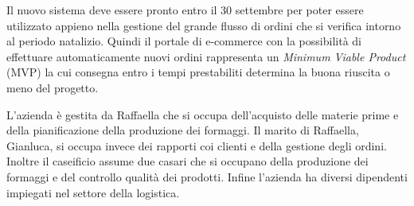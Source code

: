 Il nuovo sistema deve essere pronto entro il 30 settembre per poter essere utilizzato appieno nella gestione del grande flusso di ordini che si verifica intorno al periodo natalizio. Quindi il portale di e-commerce con la possibilità di effettuare automaticamente nuovi ordini rappresenta un \emph{Minimum Viable Product} (MVP) la cui consegna entro i tempi prestabiliti determina la buona riuscita o meno del progetto.

L'azienda è gestita da Raffaella che si occupa dell'acquisto delle materie prime e della pianificazione della produzione dei formaggi. Il marito di Raffaella, Gianluca, si occupa invece dei rapporti coi clienti e della gestione degli ordini. Inoltre il caseificio assume due casari che si occupano della produzione dei formaggi e del controllo qualità dei prodotti. Infine l'azienda ha diversi dipendenti impiegati nel settore della logistica.

